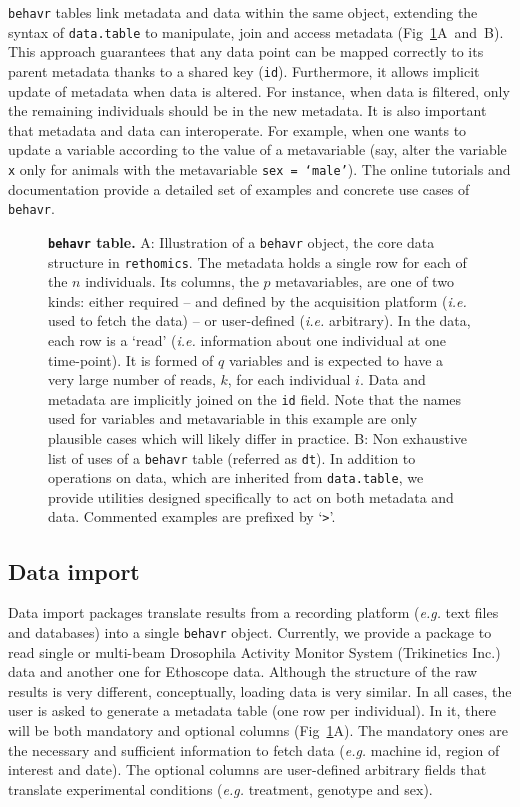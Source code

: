\documentclass[10pt,letterpaper]{article}\usepackage[]{graphicx}\usepackage[]{color}
\begin{document}
\texttt{behavr} tables link metadata and data within the same object, extending the syntax of \texttt{data.table} to manipulate, join and access metadata (Fig~\ref{fig:fig-2}A~and~B).
This approach guarantees that any data point can be mapped correctly to its parent metadata thanks to a shared key (\texttt{id}).
Furthermore, it allows implicit update of metadata when data is altered.
For instance, when data is filtered, only the remaining individuals should be in the new metadata. 
It is also important that metadata and data can interoperate.
For example, when one wants to update a variable according to the value of a metavariable (say, alter the variable \texttt{x} only for animals with the metavariable \texttt{sex = `male'}).
The online tutorials and documentation provide a detailed set of examples and concrete use cases of \texttt{behavr}. 


\begin{figure}[!h]
	\caption{{\bf \texttt{behavr} table.}
	A: Illustration of a \texttt{behavr} object, the core data structure in \texttt{rethomics}.
		The metadata holds a single row for each of the $n$ individuals. 
		Its columns, the $p$ metavariables, are one of two kinds: either required -- and defined by the acquisition platform (\emph{i.e.} used to fetch the data) -- or user-defined (\emph{i.e.} arbitrary).
		In the data, each row is a `read' (\emph{i.e.} information about one individual at one time-point).
		It is formed of $q$ variables and is expected to have a very large number of reads, $k$, for each individual $i$.
		Data and metadata are implicitly joined on the \texttt{id} field.
		Note that the names used for variables and metavariable in this example are only plausible cases which will likely differ in practice. 
		B: Non exhaustive list of uses of a \texttt{behavr} table (referred as \texttt{dt}). 
		In addition to operations on data, which are inherited from \texttt{data.table},
		we provide utilities designed specifically to act on both metadata and data.  
		Commented examples are prefixed by `\texttt{>}'.
	}
	\label{fig:fig-2}
\end{figure}

\subsection*{Data import}
Data import packages translate results from a recording platform (\emph{e.g.} text files and databases) into a single \texttt{behavr} object.
Currently, we provide a package to read single or multi-beam Drosophila Activity Monitor System (Trikinetics Inc.) data and another one for Ethoscope data\cite{geissmann_ethoscopes:_2017}.
Although the structure of the raw results is very different, conceptually, loading data is very similar.
In all cases, the user is asked to generate a metadata table (one row per individual). 
In it, there will be both mandatory and optional columns (Fig~\ref{fig:fig-2}A).
The mandatory ones are the necessary and sufficient information to fetch data (\emph{e.g.} machine id, region of interest and date). 
The optional columns are user-defined arbitrary fields that translate experimental conditions (\emph{e.g.} treatment, genotype and sex).
\end{document}
